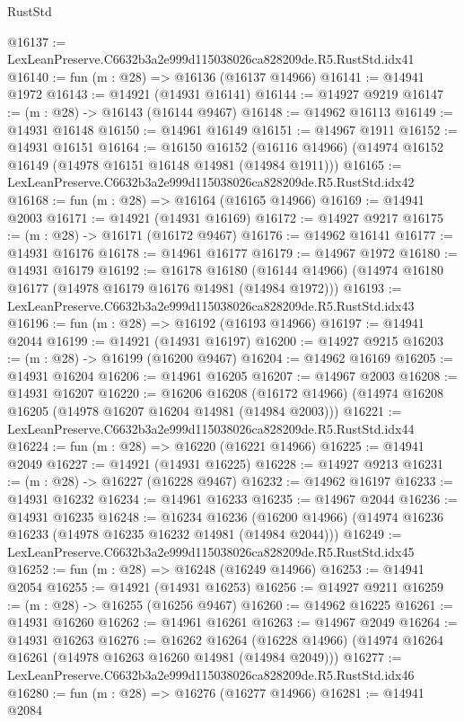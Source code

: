 \begin{lexlean}{RustStd}
\begin{coremodule}
@16137 := LexLeanPreserve.C6632b3a2e999d115038026ca828209de.R5.RustStd.idx41
@16140 := fun (m : @28) => @16136 (@16137 @14966)
@16141 := @14941 @1972
@16143 := @14921 (@14931 @16141)
@16144 := @14927 @9219
@16147 := (m : @28) -> @16143 (@16144 @9467)
@16148 := @14962 @16113
@16149 := @14931 @16148
@16150 := @14961 @16149
@16151 := @14967 @1911
@16152 := @14931 @16151
@16164 := @16150
    @16152
    (@16116 @14966)
    (@14974 @16152 @16149 (@14978 @16151 @16148 @14981 (@14984 @1911)))
@16165 := LexLeanPreserve.C6632b3a2e999d115038026ca828209de.R5.RustStd.idx42
@16168 := fun (m : @28) => @16164 (@16165 @14966)
@16169 := @14941 @2003
@16171 := @14921 (@14931 @16169)
@16172 := @14927 @9217
@16175 := (m : @28) -> @16171 (@16172 @9467)
@16176 := @14962 @16141
@16177 := @14931 @16176
@16178 := @14961 @16177
@16179 := @14967 @1972
@16180 := @14931 @16179
@16192 := @16178
    @16180
    (@16144 @14966)
    (@14974 @16180 @16177 (@14978 @16179 @16176 @14981 (@14984 @1972)))
@16193 := LexLeanPreserve.C6632b3a2e999d115038026ca828209de.R5.RustStd.idx43
@16196 := fun (m : @28) => @16192 (@16193 @14966)
@16197 := @14941 @2044
@16199 := @14921 (@14931 @16197)
@16200 := @14927 @9215
@16203 := (m : @28) -> @16199 (@16200 @9467)
@16204 := @14962 @16169
@16205 := @14931 @16204
@16206 := @14961 @16205
@16207 := @14967 @2003
@16208 := @14931 @16207
@16220 := @16206
    @16208
    (@16172 @14966)
    (@14974 @16208 @16205 (@14978 @16207 @16204 @14981 (@14984 @2003)))
@16221 := LexLeanPreserve.C6632b3a2e999d115038026ca828209de.R5.RustStd.idx44
@16224 := fun (m : @28) => @16220 (@16221 @14966)
@16225 := @14941 @2049
@16227 := @14921 (@14931 @16225)
@16228 := @14927 @9213
@16231 := (m : @28) -> @16227 (@16228 @9467)
@16232 := @14962 @16197
@16233 := @14931 @16232
@16234 := @14961 @16233
@16235 := @14967 @2044
@16236 := @14931 @16235
@16248 := @16234
    @16236
    (@16200 @14966)
    (@14974 @16236 @16233 (@14978 @16235 @16232 @14981 (@14984 @2044)))
@16249 := LexLeanPreserve.C6632b3a2e999d115038026ca828209de.R5.RustStd.idx45
@16252 := fun (m : @28) => @16248 (@16249 @14966)
@16253 := @14941 @2054
@16255 := @14921 (@14931 @16253)
@16256 := @14927 @9211
@16259 := (m : @28) -> @16255 (@16256 @9467)
@16260 := @14962 @16225
@16261 := @14931 @16260
@16262 := @14961 @16261
@16263 := @14967 @2049
@16264 := @14931 @16263
@16276 := @16262
    @16264
    (@16228 @14966)
    (@14974 @16264 @16261 (@14978 @16263 @16260 @14981 (@14984 @2049)))
@16277 := LexLeanPreserve.C6632b3a2e999d115038026ca828209de.R5.RustStd.idx46
@16280 := fun (m : @28) => @16276 (@16277 @14966)
@16281 := @14941 @2084

\end{coremodule}
\end{lexlean}
